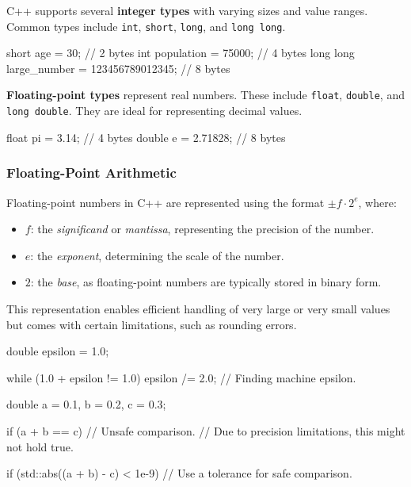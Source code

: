 C++ supports several \textbf{integer types} with varying sizes and value ranges. Common types include \texttt{int}, \texttt{short}, \texttt{long}, and \texttt{long long}.

\vspace{-0.5em}

\begin{codeblock}[language=C++, numbers=none]    
short age = 30;                             // 2 bytes
int population = 75000;                     // 4 bytes 
long long large_number = 123456789012345;   // 8 bytes
\end{codeblock}

\textbf{Floating-point types} represent real numbers. These include \texttt{float}, \texttt{double}, and \texttt{long double}. They are ideal for representing decimal values.

\vspace{-0.5em}

\begin{codeblock}[language=C++, numbers=none]
float pi = 3.14;        // 4 bytes
double e = 2.71828;     // 8 bytes
\end{codeblock}

\subsubsection{Floating-Point Arithmetic}

Floating-point numbers in C++ are represented using the format $\pm f \cdot 2^e$, where:
\begin{itemize}
    \item $f$: the \textit{significand} or \textit{mantissa}, representing the precision of the number.
    \item $e$: the \textit{exponent}, determining the scale of the number.
    \item $2$: the \textit{base}, as floating-point numbers are typically stored in binary form.
\end{itemize}

This representation enables efficient handling of very large or very small values but comes with certain limitations, such as rounding errors.

\begin{exampleblock}
    \begin{codeblock}[language=C++]
double epsilon = 1.0;
        
while (1.0 + epsilon != 1.0) {
    epsilon /= 2.0; // Finding machine epsilon.
}
    \end{codeblock}
    \begin{codeblock}[language=C++]
double a = 0.1, b = 0.2, c = 0.3;

if (a + b == c) { // Unsafe comparison.
    // Due to precision limitations, this might not hold true.
}

if (std::abs((a + b) - c) < 1e-9) {
    // Use a tolerance for safe comparison.
}
    \end{codeblock}
\end{exampleblock}

